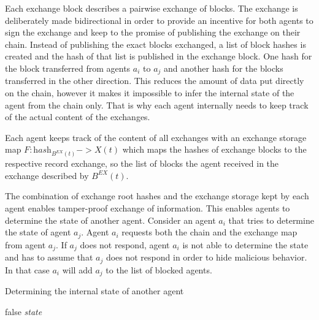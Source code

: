 Each exchange block describes a pairwise exchange of blocks. The exchange is deliberately made 
bidirectional in order to provide an incentive for both agents to sign the exchange and keep to the 
promise of publishing the exchange on their chain. Instead of publishing the exact blocks exchanged,
a list of block hashes is created and the hash of that list is published in the exchange block. One 
hash for the block transferred from agents $a_i$ to $a_j$ and another hash for the blocks transferred in the 
other direction. This reduces the amount of data put directly on the chain, however it makes it 
impossible to infer the internal state of the agent from the chain only. That is why each agent 
internally needs to keep track of the actual content of the exchanges. 

\begin{defn}
    Each agent keeps track of the content of all exchanges with an exchange storage map 
    $F: \textit{hash}_{B^{EX}(t)} -> X(t)$ which maps the hashes of exchange blocks to the respective record
    exchange, so the list of blocks the agent received in the exchange described by $B^{EX}(t)$.
\end{defn}

The combination of exchange root hashes and the exchange storage kept by each agent enables tamper-proof
exchange of information. This enables agents to determine the state of another agent. Consider an 
agent $a_i$ that tries to determine the state of agent $a_j$. Agent $a_i$ requests both the chain 
and the exchange map from agent $a_j$. If $a_j$ does not respond, agent $a_i$ is not able to determine 
the state and has to assume that $a_j$ does not respond in order to hide malicious behavior. In that case
$a_i$ will add $a_j$ to the list of blocked agents. 

\begin{algorithm}
\caption{Determining the internal state of another agent}\label{alg:internal_state}
\begin{algorithmic}[1]
 \Return false
\EndIf
{}
\EndIf
{}
\EndFor
\Return \textit{state}
\EndProcedure
\end{algorithmic}
\end{algorithm}

